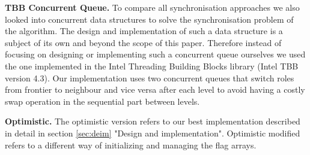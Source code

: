 \documentclass[letterpaper]{article}
\newcommand{\mypar}[1]{{\bf #1.}} %
\begin{document}
		\mypar{TBB Concurrent Queue}
		To compare all synchronisation approaches we also looked into concurrent data structures to solve the synchronisation problem of the algorithm.
		The design and implementation of such a data structure is a subject of its own and beyond the scope of this paper. Therefore instead of focusing on designing or implementing such a concurrent queue ourselves we used the one implemented in the Intel Threading Building Blocks library (Intel TBB version 4.3).
		Our implementation uses two concurrent queues that switch roles from frontier to neighbour and vice versa after each level to avoid having a costly swap operation in the sequential part between levels.

		\mypar{Optimistic}
		The optimistic version refers to our best implementation described in detail in section \ref{sec:deim} "Design and implementation".
		Optimistic modified refers to a different way of initializing and managing the flag arrays.
\end{document}

